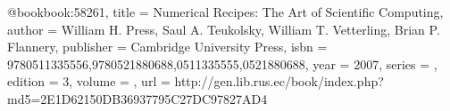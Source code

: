 @book{book:58261,
   title =     {Numerical Recipes: The Art of Scientific Computing},
   author =    {William H. Press, Saul A. Teukolsky, William T. Vetterling, Brian P. Flannery},
   publisher = {Cambridge University Press},
   isbn =      {9780511335556,9780521880688,0511335555,0521880688},
   year =      {2007},
   series =    {},
   edition =   {3},
   volume =    {},
   url =       {http://gen.lib.rus.ec/book/index.php?md5=2E1D62150DB36937795C27DC97827AD4}
}